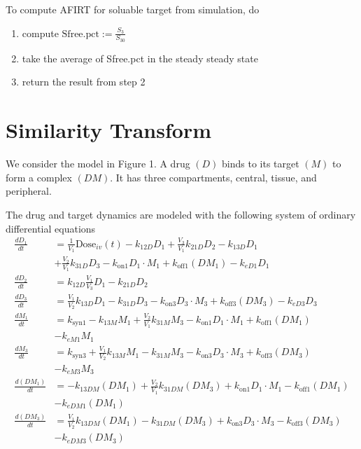 To compute AFIRT for soluable target from simulation, do
\begin{enumerate}
\item compute $\text{Sfree.pct}:=\frac{S_3}{S_{30}}$
\item take the average of Sfree.pct in the steady steady state
\item return the result from step 2
\end{enumerate}




\section{Similarity Transform}

We consider the model in Figure 1. A drug $(D)$ binds to its target $(M)$ to form a complex $(DM)$. It has three compartments, central, tissue, and peripheral.

The drug and target dynamics are modeled with the following system of ordinary differential equations
\begin{align}
\frac{dD_1}{dt} &= \frac{1}{V_1}\text{Dose}_{iv}(t) - k_{12D}D_1 + \frac{V_3}{V_1}k_{21D}D_2 - k_{13D}D_1 \nonumber \\
&+ \frac{V_2}{V_1}k_{31D}D_3 - k_{\text{on}1}D_1 \cdot M_1 + k_{\text{off}1}(DM_1) - k_{eD1}D_1 \\
\frac{dD_2}{dt} &= k_{12D}\frac{V_1}{V_3}D_1 - k_{21D}D_2 \\
\frac{dD_3}{dt} &= \frac{V_1}{V_2}k_{13D}D_1 - k_{31D}D_3 - k_{\text{on}3}D_3 \cdot M_3 + k_{\text{off}3}(DM_3) - k_{eD3}D_3 \\
\frac{dM_1}{dt} &= k_{\text{syn}1} - k_{13M}M_1 + \frac{V_2}{V_1}k_{31M}M_3 - k_{\text{on}1}D_1 \cdot M_1 + k_{\text{off}1}(DM_1) \nonumber \\ 
&- k_{eM1}M_1 \\
\frac{dM_3}{dt} &= k_{\text{syn}3} + \frac{V_1}{V_2}k_{13M}M_1 - k_{31M}M_3 - k_{\text{on}3}D_3 \cdot M_3 + k_{\text{off}3}(DM_3) \nonumber \\ 
&- k_{eM3}M_3 \\
\frac{d(DM_1)}{dt} &= - k_{13DM}(DM_1) + \frac{V_2}{V_1}k_{31DM}(DM_3) + k_{\text{on}1}D_1 \cdot M_1 - k_{\text{off}1}(DM_1) \nonumber \\ 
&- k_{eDM1}(DM_1) \\
\frac{d(DM_3)}{dt} &= \frac{V_1}{V_2}k_{13DM}(DM_1) - k_{31DM}(DM_3) + k_{\text{on}3}D_3 \cdot M_3 - k_{\text{off}3}(DM_3) \nonumber \\ 
&- k_{eDM3}(DM_3) \\
\end{align}

